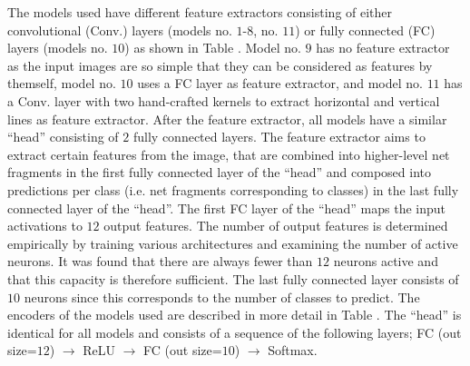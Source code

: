 The models used have different feature extractors consisting of either convolutional (Conv.) layers (models no. $1$-$8$, no. $11$) or fully connected (FC) layers (models no. $10$) as shown in Table .
Model no. $9$ has no feature extractor as the input images are so simple that they can be considered as features by themself, model no. $10$ uses a FC layer as feature extractor, and model no. $11$ has a Conv. layer with two hand-crafted kernels to extract horizontal and vertical lines as feature extractor.
After the feature extractor, all models have a similar ``head'' consisting of $2$ fully connected layers.
The feature extractor aims to extract certain features from the image, that are combined into higher-level net fragments in the first fully connected layer of the ``head'' and composed into predictions per class (i.e. net fragments corresponding to classes) in the last fully connected layer of the ``head''.
The first FC layer of the ``head'' maps the input activations to $12$ output features.
The number of output features is determined empirically by training various architectures and examining the number of active neurons.
It was found that there are always fewer than $12$ neurons active and that this capacity is therefore sufficient.
The last fully connected layer consists of $10$ neurons since this corresponds to the number of classes to predict.
The encoders of the models used are described in more detail in Table .
The ``head'' is identical for all models and consists of a sequence of the following layers; FC (out size=$12$) $\rightarrow$ ReLU $\rightarrow$ FC (out size=$10$) $\rightarrow$ Softmax.

